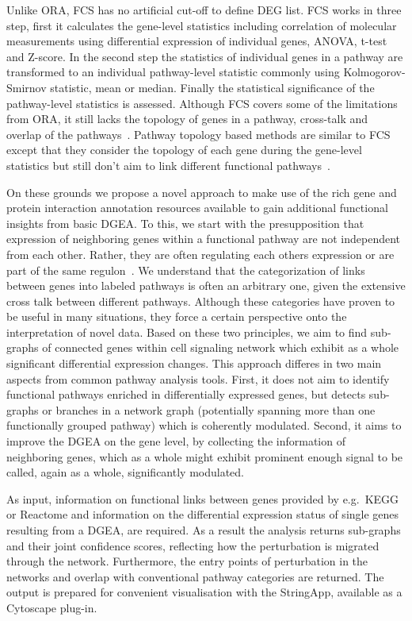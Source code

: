 \documentclass[10pt,a4paper,twocolumn]{article}
\newcommand{\TODO}[1]{\begingroup\color{red}#1\endgroup}
\begin{document}
Unlike ORA, FCS has no artificial cut-off to define DEG list. FCS works in
three step, first it calculates the gene-level statistics including
correlation of molecular measurements using differential expression of
individual genes, ANOVA, t-test and Z-score. In the second step the
statistics of individual genes in a pathway are transformed to an
individual pathway-level statistic commonly using Kolmogorov-Smirnov
statistic, mean or median. Finally the statistical significance of the
pathway-level statistics is assessed. Although FCS covers some of the
limitations from ORA, it still lacks the topology of genes in a pathway,
cross-talk and overlap of the pathways~\cite{Khatri2012,Campos}. Pathway
topology based methods are similar to FCS except that they consider the
topology of each gene during the gene-level statistics but still don't aim
to link different functional pathways~\cite{Khatri2012}.

On these grounds we propose a novel approach to make use of the rich gene
and protein interaction annotation resources available to gain additional
functional insights from basic DGEA. To this, we start with the
presupposition that expression of neighboring genes within a functional
pathway are not independent from each other. Rather, they are often
regulating each others expression or are part of the same
regulon~\cite{Michalak}. We understand that the categorization of links
between genes into labeled pathways is often an arbitrary one, given the
extensive cross talk between different pathways. Although these categories
have proven to be useful in many situations, they force a certain
perspective onto the interpretation of novel data. Based on these two
principles, we aim to find sub-graphs of connected genes within cell
signaling network which exhibit as a whole significant differential
expression changes. This approach differes in two main aspects from common
pathway analysis tools. First, it does not aim to identify functional
pathways enriched in differentially expressed genes, but detects sub-graphs
or branches in a network graph (potentially spanning more than one
functionally grouped pathway) which is coherently modulated. Second, it
aims to improve the DGEA on the gene level, by collecting the information
of neighboring genes, which as a whole might exhibit prominent enough
signal to be called, again as a whole, significantly modulated.

As input, information on functional links between genes provided by
e.g.~KEGG or Reactome and information on the differential expression status
of single genes resulting from a DGEA, are required. As a result the
analysis returns sub-graphs and their joint confidence scores, reflecting
how the perturbation is migrated through the network. Furthermore, the
entry points of perturbation in the networks and overlap with conventional
pathway categories are returned. The output is prepared for convenient
visualisation with the \TODO{StringApp, available as a Cytoscape plug-in.}
\end{document}
